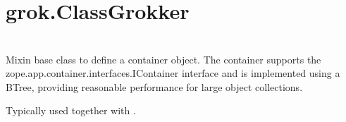 \section{}

\section{}

\section{}

\section{grok.ClassGrokker}

\section{}

    Mixin base class to define a container object. The container supports the
    zope.app.container.interfaces.IContainer interface and is implemented using
    a BTree, providing reasonable performance for large object collections.

    Typically used together with .

\section{}

\section{}

\section{}

\section{}

\section{}

